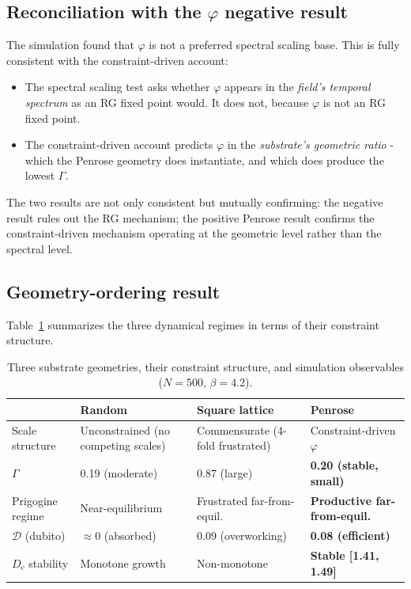 \documentclass[11pt,a4paper]{article}
\theoremstyle{plain}
\theoremstyle{definition}
\newcommand{\phiGolden}{\varphi}
\begin{document}
\subsection{Reconciliation with the $\phiGolden$ negative result}

The simulation found that $\phiGolden$ is not a preferred spectral
scaling base. This is fully consistent with the constraint-driven account:

\begin{itemize}[noitemsep]
  \item The spectral scaling test asks whether $\phiGolden$ appears
    in the \emph{field's temporal spectrum} as an RG fixed point would.
    It does not, because $\phiGolden$ is not an RG fixed point.
  \item The constraint-driven account predicts $\phiGolden$ in the
    \emph{substrate's geometric ratio} - which the Penrose geometry
    does instantiate, and which does produce the lowest $\Gamma$.
\end{itemize}

The two results are not only consistent but mutually confirming:
the negative result rules out the RG mechanism; the positive Penrose
result confirms the constraint-driven mechanism operating at the
geometric level rather than the spectral level.

\subsection{Geometry-ordering result}

Table~\ref{tab:regimes} summarizes the three dynamical regimes in terms
of their constraint structure.

\begin{table}[h]
\centering
\caption{Three substrate geometries, their constraint structure, and
  simulation observables ($N = 500$, $\beta = 4.2$).}
\label{tab:regimes}
\begin{tabular}{p{2.8cm}p{2.8cm}p{2.8cm}p{3.2cm}}
\toprule
& \textbf{Random} & \textbf{Square lattice} & \textbf{Penrose} \\
\midrule
Scale structure &
  Unconstrained (no competing scales) &
  Commensurate (4-fold frustrated) &
  Constraint-driven $\phiGolden$ \\[4pt]
$\Gamma$ & 0.19 (moderate) & 0.87 (large) & \textbf{0.20 (stable, small)} \\[4pt]
Prigogine regime &
  Near-equilibrium &
  Frustrated far-from-equil. &
  \textbf{Productive far-from-equil.} \\[4pt]
$\mathcal{D}$ (dubito) &
  $\approx 0$ (absorbed) &
  0.09 (overworking) &
  \textbf{0.08 (efficient)} \\[4pt]
$D_c$ stability &
  Monotone growth &
  Non-monotone &
  \textbf{Stable [1.41, 1.49]} \\
\bottomrule
\end{tabular}
\end{table}
\end{document}
